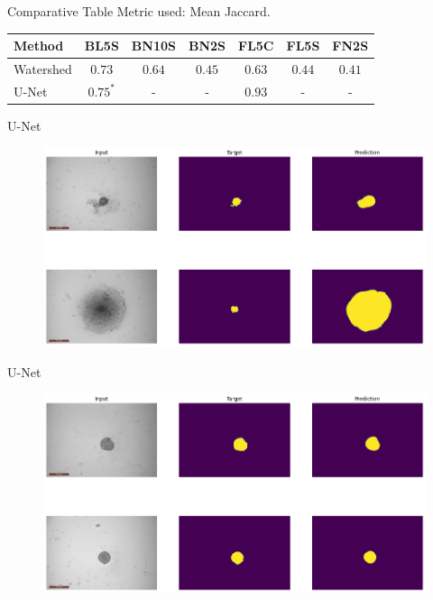
\begin{frame}{Comparative Table}
    Metric used: \alert{Mean Jaccard}.
    \begin{table}[]
        \centering
        \setlength{\tabcolsep}{10pt}
        
        {
            \begin{tabular}{lcccccc}
                Method & BL5S & BN10S & BN2S & FL5C & FL5S & FN2S \\
                \midrule
                Watershed & $0.73$ & $0.64$ & $0.45$ &  $0.63$ & $0.44$ & $0.41$ \\
                U-Net & $0.75^*$ & - & - & $0.93$ & - & -
            \end{tabular}
        }
    \end{table}
\end{frame}


\begin{frame}{U-Net}
    \begin{figure}[!htb]
        \centering
        \includegraphics[width=13cm]{figures/result/wrong_example}
    \end{figure}
\end{frame}


\begin{frame}{U-Net}
    \begin{figure}[!htb]
        \centering
        \includegraphics[width=13cm]{figures/result/better_example}
    \end{figure}
\end{frame}
